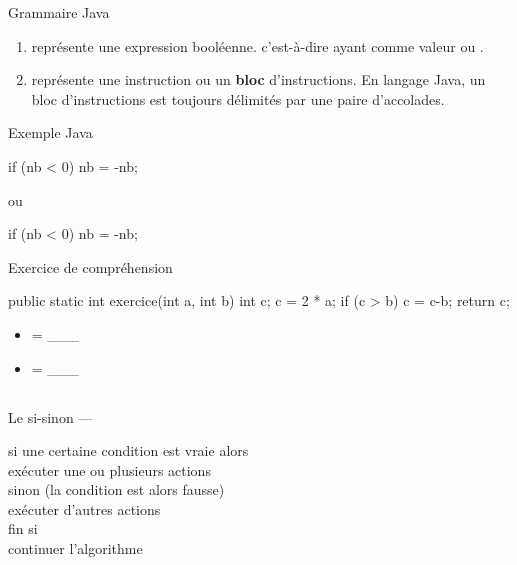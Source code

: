 \begin{hideedit}
\begin{frame}[fragile]{Grammaire Java}
  \begin{enumerate}
    \item {} représente une expression booléenne. 
      c'est-à-dire ayant comme valeur  ou .
    \item {} représente une instruction ou un 
      \textbf{bloc} d'instructions. En langage Java, un bloc 
       d'instructions est toujours délimités par une paire 
      d'accolades. 
  \end{enumerate}
\end{frame}

\begin{frame}[fragile]{Exemple Java}

  \begin{java}
if (nb < 0)
  nb = -nb;
  \end{java}

  ou
  \begin{java}
if (nb < 0) {
  nb = -nb;
}
  \end{java}

\end{frame}

\begin{frame}[fragile]{Exercice de compréhension}
  \begin{java}
public static int exercice(int a, int b) {
  int c;
  c = 2 * a;
  if (c > b) {
      c = c-b;
  }
  return c;
}
  \end{java}

  \begin{multicols}{2}
    \begin{itemize}[<+->]
      \item {} = \_\_\_
      \item {} = \_\_\_
    \end{itemize}
  \end{multicols}
\end{frame}

\subsection{}
\begin{frame}{Le si-sinon --- }
  \begin{langagenaturel}
    si une certaine condition est vraie alors\\
      \tab exécuter une ou plusieurs actions\\
    sinon (la condition est alors fausse)\\
      \tab exécuter d'autres actions\\
    fin si\\
    continuer l'algorithme
  \end{langagenaturel}
\end{frame}


\end{hideedit}
